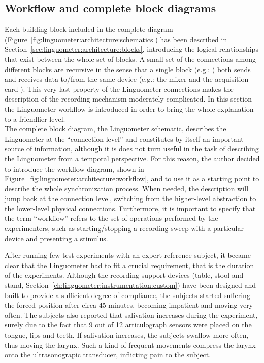 \subsection{Workflow and complete block diagrams}
\label{sec:linguometer:architecture:diagram}
Each building block included in the complete diagram
(Figure~\ref{fig:linguometer:architecture:schematics}) has been described in 
Section~\ref{sec:linguometer:architecture:blocks}, introducing
the logical relationships that exist between the whole set of blocks.
A small set of the connections among different blocks are recursive in the 
sense that  a single block (e.g.: ) both sends and receives data 
to/from the same device (e.g.: the mixer  and the acquisition 
card ). This very last property of the Linguometer connections makes 
the description of the recording mechanism moderately complicated.
In this section the Linguometer workflow is introduced in order to bring the
whole explanation to a friendlier level.\\

The complete block diagram, the Linguometer schematic, describes the Linguometer
at the ``connection level'' and constitutes by itself an important source of
information, although it is does not turn useful in the task of describing
the Linguometer from a temporal perspective.
For this reason, the author decided to introduce the workflow diagram, shown
in Figure~\ref{fig:linguometer:architecture:workflow}, and to use it as a
starting point to describe the whole synchronization process.
When needed, the description will jump back at the connection level, switching
from the higher-level abstraction to the lower-level physical connections.
Furthermore, it is important to specify that the term ``workflow'' refers to 
the set of operations performed by the
experimenters, such as starting/stopping a recording sweep with a particular 
device and presenting a stimulus.

After running few test experiments with an expert reference subject, it 
became clear that the Linguometer had to fit a crucial requirement, that is
the  duration of the experiments.
Although the recording-support devices (table, stool and stand,
Section~\ref{ch:linguometer:instrumentation:custom}) have been designed and 
built 
to provide a sufficient degree of compliance, the subjects started suffering
the forced position after circa 45 minutes, becoming impatient and moving very
often. 
The subjects also reported that salivation increases during the experiment,
surely due to the fact that 9 out of 12 articulograph sensors were placed on the
tongue, lips and teeth.
If salivation increases, the subjects swallow more often, thus moving the
larynx. Such a kind of frequent movements compress the
larynx onto the ultrasonograpic transducer, inflicting pain to the subject.

